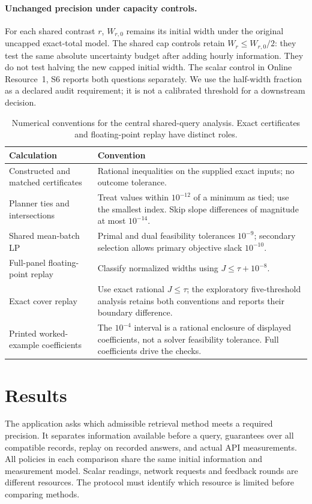 \documentclass[12pt]{article}
\begin{document}
\paragraph{Unchanged precision under capacity controls.}
For each shared contrast $r$, $W_{r,0}$ remains its initial width under the
original uncapped exact-total model. The shared cap controls retain
$W_r\leq W_{r,0}/2$: they test the same absolute uncertainty budget after
adding hourly information. They do not test halving the new capped initial
width. The scalar control in Online Resource~1, S6 reports both
questions separately. We use the half-width fraction as a declared audit
requirement; it is not a calibrated threshold for a downstream decision.
\begin{table}[htbp]\centering\small
\caption{Numerical conventions for the central shared-query analysis.
Exact certificates and floating-point replay have distinct roles.}
\label{tab:numerical-conventions}
\begin{tabular}{@{}>{\raggedright\arraybackslash}p{.27\linewidth}>{\raggedright\arraybackslash}p{.66\linewidth}@{}}
\toprule
Calculation & Convention\\\midrule
Constructed and matched certificates &
Rational inequalities on the supplied exact inputs; no outcome tolerance.\\
Planner ties and intersections &
Treat values within $10^{-12}$ of a minimum as tied; use the smallest index.
Skip slope differences of magnitude at most $10^{-14}$.\\
Shared mean-batch LP &
Primal and dual feasibility tolerances $10^{-9}$; secondary selection
allows primary objective slack $10^{-10}$.\\
Full-panel floating-point replay &
Classify normalized widths using $J\leq\tau+10^{-8}$.\\
Exact cover replay &
Use exact rational $J\leq\tau$; the exploratory five-threshold analysis
retains both conventions and reports their boundary difference.\\
Printed worked-example coefficients &
The $10^{-4}$ interval is a rational enclosure of displayed coefficients,
not a solver feasibility tolerance. Full coefficients drive the checks.\\
\bottomrule\end{tabular}\end{table}
\section{Results}\label{sec:evaluation}
The application asks which admissible retrieval method meets a required
precision. It separates information available before a query, guarantees
over all compatible records, replay on recorded answers, and actual API
measurements. All policies in each comparison share the same initial
information and measurement model. Scalar readings, network requests and
feedback rounds are different resources. The protocol must identify which
resource is limited before comparing methods.
\end{document}
